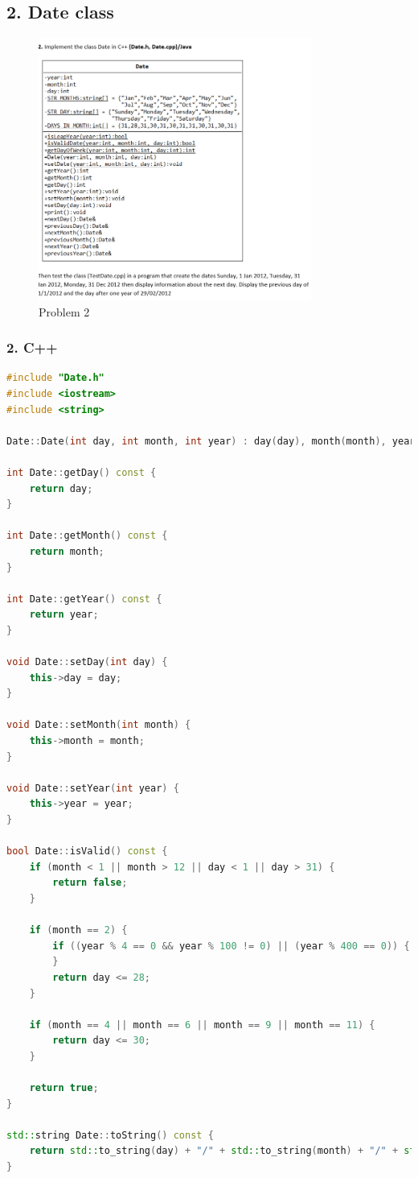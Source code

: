 \documentclass{article}
\begin{document}
\subsection*{2. Date class}
\begin{figure}[H]
    \centering
    \includegraphics[width=0.8\textwidth]{./Assets/Task requirements/Assignment10/2.png}
    \caption{Problem 2}
\end{figure}

\subsubsection*{2. C++}

\begin{lstlisting}[language=C++, caption=Date.cpp]
#include "Date.h"
#include <iostream>
#include <string>

Date::Date(int day, int month, int year) : day(day), month(month), year(year) {}

int Date::getDay() const {
    return day;
}

int Date::getMonth() const {
    return month;
}

int Date::getYear() const {
    return year;
}

void Date::setDay(int day) {
    this->day = day;
}

void Date::setMonth(int month) {
    this->month = month;
}

void Date::setYear(int year) {
    this->year = year;
}

bool Date::isValid() const {
    if (month < 1 || month > 12 || day < 1 || day > 31) {
        return false;
    }

    if (month == 2) {
        if ((year % 4 == 0 && year % 100 != 0) || (year % 400 == 0)) {
        }
        return day <= 28;
    }

    if (month == 4 || month == 6 || month == 9 || month == 11) {
        return day <= 30;
    }

    return true;
}

std::string Date::toString() const {
    return std::to_string(day) + "/" + std::to_string(month) + "/" + std::to_string(year);
}
\end{lstlisting}
\end{document}
